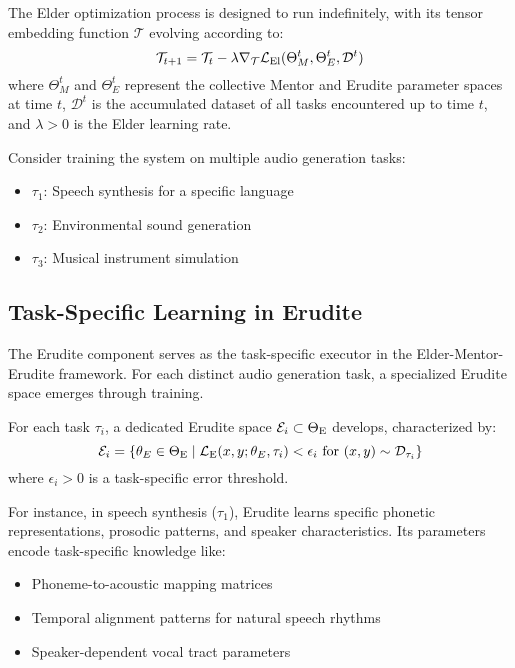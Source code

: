 \begin{proposition}
The Elder optimization process is designed to run indefinitely, with its tensor embedding function $\mathcal{T}$ evolving according to:
\begin{equation}
\mathcal{T}_{t+1} = \mathcal{T}_t - \lambda \nabla_{\mathcal{T}} \mathcal{L}_{\text{El}}(\Theta_M^t, \Theta_E^t, \mathcal{D}^t)
\end{equation}
where $\Theta_M^t$ and $\Theta_E^t$ represent the collective Mentor and Erudite parameter spaces at time $t$, $\mathcal{D}^t$ is the accumulated dataset of all tasks encountered up to time $t$, and $\lambda > 0$ is the Elder learning rate.
\end{proposition}

\begin{example}
Consider training the system on multiple audio generation tasks:
\begin{itemize}
    \item $\tau_1$: Speech synthesis for a specific language
    \item $\tau_2$: Environmental sound generation
    \item $\tau_3$: Musical instrument simulation
\end{itemize}
\end{example}

\subsection{Task-Specific Learning in Erudite}

The Erudite component serves as the task-specific executor in the Elder-Mentor-Erudite framework. For each distinct audio generation task, a specialized Erudite space emerges through training.

\begin{definition}
For each task $\tau_i$, a dedicated Erudite space $\mathcal{E}_i \subset \Theta_{\text{E}}$ develops, characterized by:
\begin{equation}
\mathcal{E}_i = \{\theta_E \in \Theta_{\text{E}} \mid \mathcal{L}_{\text{E}}(x, y; \theta_E, \tau_i) < \epsilon_i \text{ for } (x,y) \sim \mathcal{D}_{\tau_i}\}
\end{equation}
where $\epsilon_i > 0$ is a task-specific error threshold.
\end{definition}

For instance, in speech synthesis ($\tau_1$), Erudite learns specific phonetic representations, prosodic patterns, and speaker characteristics. Its parameters encode task-specific knowledge like:
\begin{itemize}
    \item Phoneme-to-acoustic mapping matrices
    \item Temporal alignment patterns for natural speech rhythms
    \item Speaker-dependent vocal tract parameters
\end{itemize}

